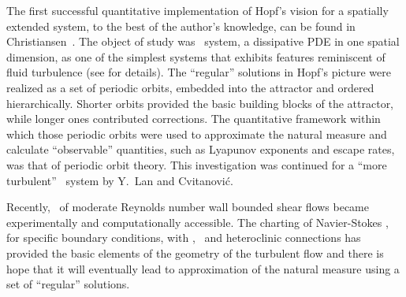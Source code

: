 The first successful quantitative implementation of Hopf's
vision for a spatially extended system, to the best of the
author's knowledge, can be found in
Christiansen~\etal{}. The object of study 
was \KS\ system,
a dissipative PDE in one spatial dimension, as one of the
simplest systems that exhibits features reminiscent of fluid
turbulence (see  for details). The ``regular''
solutions in Hopf's picture were realized as a set of periodic
orbits, embedded into the attractor and ordered hierarchically.
Shorter orbits provided the basic building blocks of the
attractor, while longer ones contributed corrections.  The
quantitative framework within which those periodic orbits were
used to approximate the natural measure and calculate
``observable'' quantities, such as Lyapunov exponents and
escape rates, was that of periodic orbit theory. This
investigation was continued for a ``more turbulent'' \KS\
system by Y.~Lan and Cvitanovi\'c.

Recently, \statesp\ of moderate Reynolds number wall bounded
shear flows became experimentally and
computationally
accessible. The charting of Navier-Stokes \statesp, for
specific boundary conditions, with \eqva, \reqva\
and heteroclinic connections has provided the basic elements of
the geometry of the turbulent flow and there is hope that it
will eventually lead to approximation of the natural measure
using a set of ``regular'' solutions.
